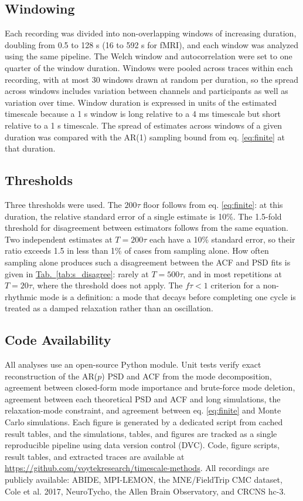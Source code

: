 \documentclass[pdflatex,lineno,sn-nature]{sn-jnl}
\newcommand{\tabpanel}[2][]{\hyperref[#2]{Tab.~#1\ref*{#2}}}
\theoremstyle{thmstyleone}
\theoremstyle{thmstyletwo}
\theoremstyle{thmstylethree}
\begin{document}
\subsection{Windowing}

Each recording was divided into non-overlapping windows of increasing duration, doubling from 0.5 to 128 s (16 to 592 s for fMRI), and each window was analyzed using the same pipeline. The Welch window and autocorrelation were set to one quarter of the window duration. Windows were pooled across traces within each recording, with at most 30 windows drawn at random per duration, so the spread across windows includes variation between channels and participants as well as variation over time. Window duration is expressed in units of the estimated timescale because a 1 s window is long relative to a 4 ms timescale but short relative to a 1 s timescale. The spread of estimates across windows of a given duration was compared with the AR(1) sampling bound from eq. \ref{eq:finite} at that duration.

\subsection{Thresholds}

Three thresholds were used. The $200\tau$ floor follows from eq. \ref{eq:finite}: at this duration, the relative standard error of a single estimate is 10\%. The 1.5-fold threshold for disagreement between estimators follows from the same equation. Two independent estimates at $T = 200\tau$ each have a 10\% standard error, so their ratio exceeds 1.5 in less than 1\% of cases from sampling alone. How often sampling alone produces such a disagreement between the ACF and PSD fits is given in \tabpanel{tab:s_disagree}: rarely at $T = 500\tau$, and in most repetitions at $T = 20\tau$, where the threshold does not apply. The $f\tau < 1$ criterion for a non-rhythmic mode is a definition: a mode that decays before completing one cycle is treated as a damped relaxation rather than an oscillation.

\subsection{Code Availability}

All analyses use an open-source Python module. Unit tests verify exact reconstruction of the AR($p$) PSD and ACF from the mode decomposition, agreement between closed-form mode importance and brute-force mode deletion, agreement between each theoretical PSD and ACF and long simulations, the relaxation-mode constraint, and agreement between eq. \ref{eq:finite} and Monte Carlo simulations. Each figure is generated by a dedicated script from cached result tables, and the simulations, tables, and figures are tracked as a single reproducible pipeline using data version control (DVC). Code, figure scripts, result tables, and extracted traces are available at \href{https://github.com/voytekresearch/timescale-methods}{https://github.com/voytekresearch/timescale-methods}. All recordings are publicly available: ABIDE, MPI-LEMON, the MNE/FieldTrip CMC dataset, Cole et al. 2017, NeuroTycho, the Allen Brain Observatory, and CRCNS hc-3.
\end{document}
